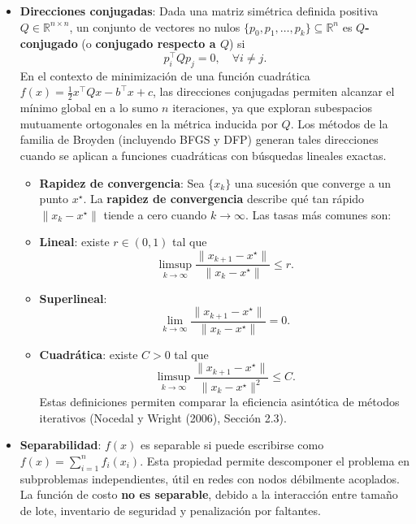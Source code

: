 \documentclass[
  spanish,
  us-letterpaper,
]{scrreprt}
\providecommand{\tightlist}{%
  \setlength{\itemsep}{0pt}\setlength{\parskip}{0pt}}
\numberwithin{equation}{section}
\begin{document}
\begin{itemize}
  \(Q \in \mathbb{R}^{n \times n}\) simétrica. Si \(Q\) es constante, el
  Hessiano \(\nabla^2 f(x) = Q\) también lo es, lo que simplifica el
  análisis de curvatura en modelos de costo.
\item
  \textbf{Direcciones conjugadas}: Dada una matriz simétrica definida
  positiva \(Q \in \mathbb{R}^{n \times n}\), un conjunto de vectores no
  nulos \(\{p_0, p_1, \dots, p_{k}\} \subseteq \mathbb{R}^n\) es
  \textbf{\(Q\)-conjugado} (o \textbf{conjugado respecto a \(Q\)}) si\\
  \[
  p_i^\top Q p_j = 0, \quad \forall i \neq j.
  \] En el contexto de minimización de una función cuadrática
  \(f(x) = \tfrac{1}{2} x^\top Q x - b^\top x + c\), las direcciones
  conjugadas permiten alcanzar el mínimo global en a lo sumo \(n\)
  iteraciones, ya que exploran subespacios mutuamente ortogonales en la
  métrica inducida por \(Q\). Los métodos de la familia de Broyden
  (incluyendo BFGS y DFP) generan tales direcciones cuando se aplican a
  funciones cuadráticas con búsquedas lineales exactas.

  \begin{itemize}
  \tightlist
  \item
    \textbf{Rapidez de convergencia}: Sea \(\{x_k\}\) una sucesión que
    converge a un punto \(x^\star\). La \textbf{rapidez de convergencia}
    describe qué tan rápido \(\|x_k - x^\star\|\) tiende a cero cuando
    \(k \to \infty\). Las tasas más comunes son:
  \item
    \textbf{Lineal}: existe \(r \in (0,1)\) tal que\\
    \[
      \limsup_{k \to \infty} \frac{\|x_{k+1} - x^\star\|}{\|x_k - x^\star\|} \leq r.
      \]
  \item
    \textbf{Superlineal}:\\
    \[
      \lim_{k \to \infty} \frac{\|x_{k+1} - x^\star\|}{\|x_k - x^\star\|} = 0.
      \]
  \item
    \textbf{Cuadrática}: existe \(C > 0\) tal que\\
    \[
      \limsup_{k \to \infty} \frac{\|x_{k+1} - x^\star\|}{\|x_k - x^\star\|^2} \leq C.
      \] Estas definiciones permiten comparar la eficiencia asintótica
    de métodos iterativos (Nocedal y Wright (2006), Sección 2.3).
  \end{itemize}
\item
  \textbf{Separabilidad}: \(f(x)\) es separable si puede escribirse como
  \(f(x) = \sum_{i=1}^n f_i(x_i)\). Esta propiedad permite descomponer
  el problema en subproblemas independientes, útil en redes con nodos
  débilmente acoplados. La función de costo \textbf{no es separable},
  debido a la interacción entre tamaño de lote, inventario de seguridad
  y penalización por faltantes.
\end{itemize}
\end{document}
